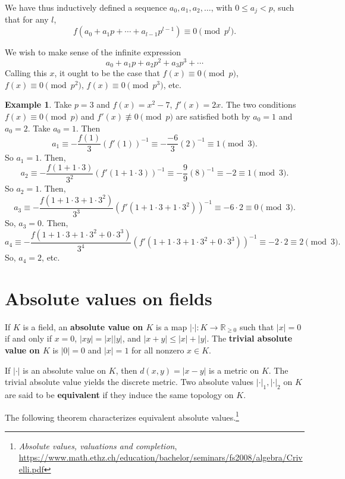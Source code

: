 \documentclass{article}
\theoremstyle{plain}
\theoremstyle{definition}
\newtheorem{example}[theorem]{Example}
\begin{document}
We have thus inductively defined a sequence $a_0,a_1,a_2,\ldots$, with $0 \leq a_j < p$, such that for any
$l$, 
\[
f(a_0+a_1p+\cdots+a_{l-1}p^{l-1}) \equiv 0 \pmod{p^l}.
\]

We wish to make sense of the infinite expression
\[
a_0+a_1p+a_2p^2+a_3p^3+\cdots
\]
Calling this $x$, it ought to be the case that $f(x) \equiv 0 \pmod{p}$, $f(x) \equiv 0 \pmod{p^2}$, $f(x) \equiv 0 \pmod{p^3}$, etc.



\begin{example}
Take $p=3$ and $f(x)=x^2-7$, $f'(x)=2x$. The two conditions $f(x) \equiv 0 \pmod{p}$ and $f'(x) \not \equiv 0 \pmod{p}$
are satisfied both by $a_0=1$ and $a_0=2$. Take $a_0=1$. Then
\[
a_1 \equiv -\frac{f(1)}{3} (f'(1))^{-1} 
\equiv
-\frac{-6}{3} (2)^{-1}
\equiv 1  \pmod{3}.
\]
So $a_1=1$. Then,
\[
a_2 \equiv -\frac{f(1+1\cdot 3)}{3^2} (f'(1+1\cdot 3))^{-1}
\equiv -\frac{9}{9}(8)^{-1} \equiv -2 \equiv 1 \pmod{3}.
\]
So $a_2=1$.
Then,
\[
a_3 \equiv -\frac{f(1+1\cdot 3+1\cdot 3^2)}{3^3} (f'(1+1\cdot 3+1\cdot 3^2))^{-1}
\equiv -6 \cdot 2 
\equiv 0 \pmod{3}.
\]
So, $a_3=0$. Then, 
\[
a_4 \equiv -\frac{f(1+1\cdot 3+1\cdot 3^2+0\cdot 3^3)}{3^4}(f'(1+1\cdot 3+1\cdot 3^2+0\cdot 3^3))^{-1}
\equiv -2 \cdot 2 \equiv 2 \pmod{3}.
\]
So, $a_4=2$, etc.
\end{example}


\section{Absolute values on fields}
If $K$ is a field, an \textbf{absolute value on $K$} is a map $|\cdot|:K \to \mathbb{R}_{\geq 0}$ such that
$|x|=0$ if and only if $x=0$, $|xy|=|x||y|$, and $|x+y| \leq |x|+|y|$. The \textbf{trivial absolute value on $K$}
is $|0|=0$ and $|x|=1$ for all nonzero $x \in K$. 

If $|\cdot|$ is an absolute value on $K$, then $d(x,y)=|x-y|$ is a metric on $K$. The trivial absolute value yields the discrete
metric. 
Two absolute values $|\cdot|_1,|\cdot|_2$ on $K$ are said to be \textbf{equivalent} if 
they induce the same topology on $K$. 

The following theorem characterizes equivalent absolute values.\footnote{{\em Absolute values, valuations and completion}, \url{https://www.math.ethz.ch/education/bachelor/seminars/fs2008/algebra/Crivelli.pdf}}
\end{document}
